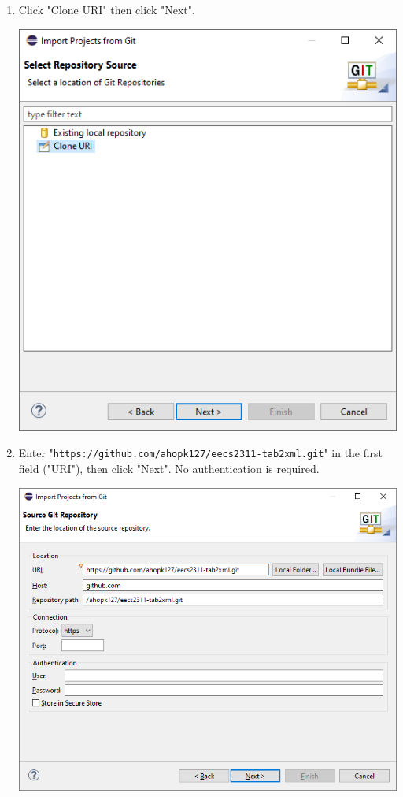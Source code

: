 \documentclass[11pt]{article}
\begin{document}
\begin{enumerate}
\begin{center}
\end{center}
\item Click "Clone URI" then click "Next".
\begin{center}
\includegraphics[width=.9\linewidth]{../Screenshots/eclipse-install-3.png}
\end{center}
\item Enter "\texttt{https://github.com/ahopk127/eecs2311-tab2xml.git}" in the first field ("URI"), then click "Next".  No authentication is required.
\begin{center}
\includegraphics[width=.9\linewidth]{../Screenshots/eclipse-install-4.png}

\end{center}
\end{enumerate}
\end{document}
